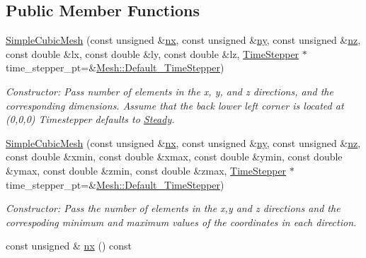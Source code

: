 \subsection*{Public Member Functions}
\begin{DoxyCompactItemize}
\item 
\hyperlink{classoomph_1_1SimpleCubicMesh_a6732b9fc1cd2e98929158fc300b5b0c7}{Simple\+Cubic\+Mesh} (const unsigned \&\hyperlink{classoomph_1_1SimpleCubicMesh_ad29c917ec0adb29ad24e086e3dcd0b6f}{nx}, const unsigned \&\hyperlink{classoomph_1_1SimpleCubicMesh_a16979ec3b0e88fb37730415190021c1c}{ny}, const unsigned \&\hyperlink{classoomph_1_1SimpleCubicMesh_ad78725440e4e87598fd9339653b28e61}{nz}, const double \&lx, const double \&ly, const double \&lz, \hyperlink{classoomph_1_1TimeStepper}{Time\+Stepper} $\ast$time\+\_\+stepper\+\_\+pt=\&\hyperlink{classoomph_1_1Mesh_a12243d0fee2b1fcee729ee5a4777ea10}{Mesh\+::\+Default\+\_\+\+Time\+Stepper})
\begin{DoxyCompactList}\small\item\em Constructor\+: Pass number of elements in the x, y, and z directions, and the corresponding dimensions. Assume that the back lower left corner is located at (0,0,0) Timestepper defaults to \hyperlink{classoomph_1_1Steady}{Steady}. \end{DoxyCompactList}\item 
\hyperlink{classoomph_1_1SimpleCubicMesh_a22d32a0d85ab3ec9ac3e52cad0bb81d7}{Simple\+Cubic\+Mesh} (const unsigned \&\hyperlink{classoomph_1_1SimpleCubicMesh_ad29c917ec0adb29ad24e086e3dcd0b6f}{nx}, const unsigned \&\hyperlink{classoomph_1_1SimpleCubicMesh_a16979ec3b0e88fb37730415190021c1c}{ny}, const unsigned \&\hyperlink{classoomph_1_1SimpleCubicMesh_ad78725440e4e87598fd9339653b28e61}{nz}, const double \&xmin, const double \&xmax, const double \&ymin, const double \&ymax, const double \&zmin, const double \&zmax, \hyperlink{classoomph_1_1TimeStepper}{Time\+Stepper} $\ast$time\+\_\+stepper\+\_\+pt=\&\hyperlink{classoomph_1_1Mesh_a12243d0fee2b1fcee729ee5a4777ea10}{Mesh\+::\+Default\+\_\+\+Time\+Stepper})
\begin{DoxyCompactList}\small\item\em Constructor\+: Pass the number of elements in the x,y and z directions and the correspoding minimum and maximum values of the coordinates in each direction. \end{DoxyCompactList}\item 
const unsigned \& \hyperlink{classoomph_1_1SimpleCubicMesh_ad29c917ec0adb29ad24e086e3dcd0b6f}{nx} () const

\end{DoxyCompactItemize}
